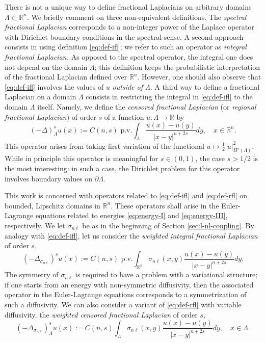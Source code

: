 \documentclass{amsart}
\newcommand{\domain}{\Lambda}
\newcommand{\snl}{{\sigma_{n\ell}}}
\def\R{{\mathbb R}}
\def\rn{{{\mathbb R}^n}}
\theoremstyle{plain}
\numberwithin{equation}{section}
\numberwithin{table}{section}
\numberwithin{figure}{section}
\numberwithin{theorem}{section}
\numberwithin{corollary}{section}
\numberwithin{definition}{section}
\numberwithin{lemma}{section}
\numberwithin{proposition}{section}
\numberwithin{remark}{section}
\begin{document}
There is not a unique way to define fractional Laplacians on arbitrary domains $\domain \subset \rn$. We briefly comment on three non-equivalent definitions. The {\em spectral fractional Laplacian} corresponds to a non-integer power of the Laplace operator with Dirichlet boundary conditions in the spectral sense. A second approach consists in using definition \eqref{eq:def-ifl}; we refer to such an operator as {\em integral fractional Laplacian.} As opposed to the spectral operator, the integral one does not depend on the domain $\domain$; this definition keeps the probabilistic interpretation of the fractional Laplacian defined over $\rn$.
However, one should also observe that \eqref{eq:def-ifl} involves the values of $u$ {\em outside of $\domain$}. 
A third way to define a fractional Laplacian on a domain $\domain$ consists in restricting the integral in \eqref{eq:def-ifl} to the domain $\domain$ itself. Namely, we define the \emph{censored fractional Laplacian} (or \emph{regional fractional Laplacian}) of order $s$ of a function $u \colon \domain \to \R$ by
\begin{equation}\label{eq:def-rfl}
(-\Delta)_\domain^s u (x) := C(n,s) \mbox{ p.v.} \int_\domain \frac{u(x)-u(y)}{|x-y|^{n+2s}} dy, \quad x \in \rn. 
\end{equation}
This operator arises from taking first variation of the functional $u \mapsto \frac12|u|^2_{H^s(\domain)}$.
While in principle this operator is meaningful for $s \in (0,1)$, the case $s>1/2$ is the most interesting: in such a case, the Dirichlet problem for this operator involves boundary values on $\partial \domain$.

This work is concerned with operators related to \eqref{eq:def-ifl} and \eqref{eq:def-rfl} on bounded, Lipschitz domains in $\rn$. These operators shall arise in the Euler-Lagrange equations related to energies \eqref{eq:energy-I} and \eqref{eq:energy-III}, respectively. 
We let $\snl$ be as in the beginning of Section \ref{sec:l-nl-coupling}. By analogy with \eqref{eq:def-ifl}, let us consider the \emph{weighted integral fractional Laplacian} of order $s$, 
\begin{equation}\label{eq:def-wifl}
(-\Delta_\snl)^s u (x) := C(n,s) \mbox{ p.v.}\int_{\rn} \snl(x,y)\frac{u(x)-u(y)}{|x-y|^{n+2s}} dy.
\end{equation}
The symmetry of $\snl$ is required to have a problem with a variational structure; if one starts from an energy with non-symmetric diffusivity, then the associated operator in the Euler-Lagrange equations corresponds to a symmetrization of such a diffusivity. We can also consider a variant of \eqref{eq:def-rfl} with variable diffusivity, the \emph{weighted censored fractional Laplacian} of order $s$,
\begin{equation}\label{eq:def-wrfl}
(-\Delta_\snl)^s_\domain u (x) :=  C(n,s) \int_{\domain} \snl(x,y)\frac{u(x)-u(y)}{|x-y|^{n+2s}} dy, \quad x \in \domain.
\end{equation}
\end{document}
